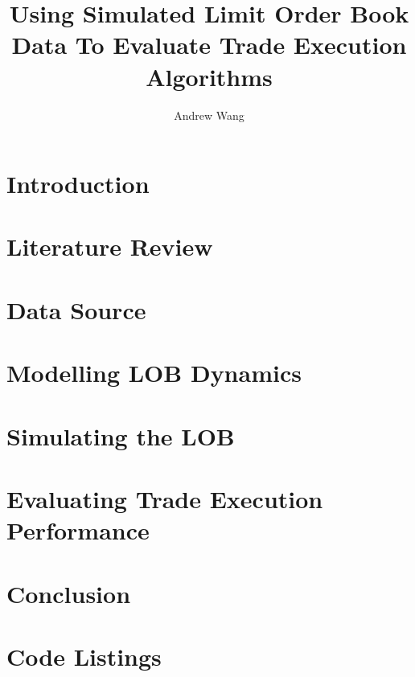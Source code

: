 \documentclass[12pt,lot,lol,lof]{puthesis_undergraduate}
\title{Using Simulated Limit Order Book Data To Evaluate Trade Execution Algorithms}
\author{Andrew Wang}
\begin{document}
\chapter{Introduction}\label{ch:intro}


\chapter{Literature Review}\label{ch:litreview}


\chapter{Data Source}\label{ch:data_source}


\chapter{Modelling LOB Dynamics}\label{ch:experiment}


\chapter{Simulating the LOB} \label{ch:simulation}


\chapter{Evaluating Trade Execution Performance} \label{ch:trade_execution}


\chapter{Conclusion}


\appendix
\chapter{Code Listings}



 \label{bib}
\end{document}
